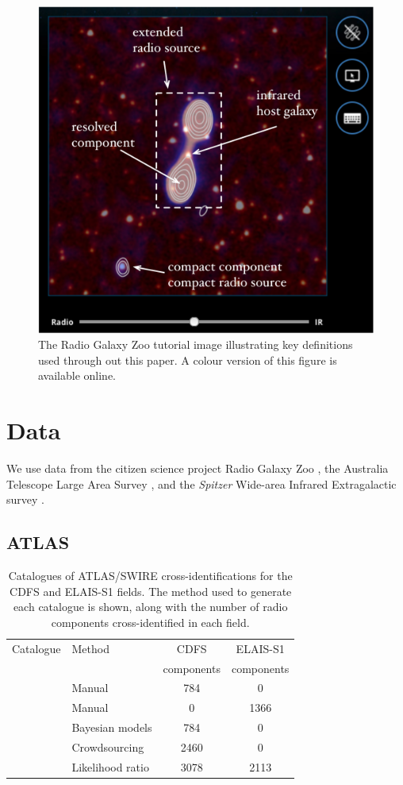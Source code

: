 \documentclass[fleqn,usenatbib,usedcolumn]{mnras}
\begin{document}
  \begin{figure}
\begin{center}
    \includegraphics[width=0.75\linewidth]{images/fig1.png}
    \caption{The Radio Galaxy Zoo tutorial image illustrating key definitions used through out this paper. A colour version of this figure is available online.}\label{fig1}
  \end{center}
  \end{figure}

\section{Data}\label{sec:data}

  We use data from the citizen science project Radio Galaxy Zoo
  \citep{banfield15}, the Australia Telescope Large Area Survey
  \citep[ATLAS;][]{norris06,franzen15}, and the \emph{Spitzer} Wide-area Infrared
  Extragalactic survey \citep[SWIRE;][]{lonsdale03swire, surace05swire}.

  \subsection{ATLAS}\label{sec:atlas}
    \begin{table}
      \caption{Catalogues of ATLAS/SWIRE cross-identifications for the CDFS
        and ELAIS-S1 fields. The method used to generate each catalogue is
        shown, along with the number of radio components cross-identified in each
        field. }
      \label{tab:atlas-cids}
      \begin{tabular}{llcc}
        \hline
        Catalogue & Method & CDFS & ELAIS-S1\\
         & & components & components\\
        \hline
        \citet{norris06} & Manual & 784 & 0\\
        \citet{middelberg08} & Manual & 0 & 1366\\
        \citet{fan15} & Bayesian models & 784 & 0\\
        \citet{wong17} & Crowdsourcing & 2460 & 0 \\
        \citet{weston17} & Likelihood ratio & 3078 & 2113\\
        \hline
      \end{tabular}
    \end{table}
\end{document}
